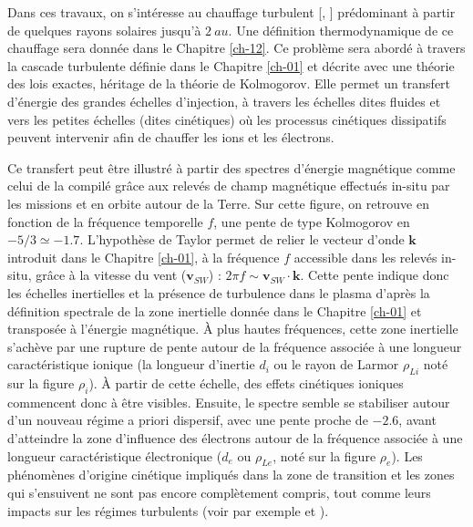 Dans ces travaux, on s'intéresse au chauffage turbulent [\cite{tu_mhd_1995}, \cite{kiyani_dissipation_2015}] prédominant à partir de quelques rayons solaires jusqu'à $\SI{2}{au}$. Une définition thermodynamique de ce chauffage sera donnée dans le Chapitre \ref{ch-12}. Ce problème sera abordé à travers la cascade turbulente définie dans le Chapitre \ref{ch-01} et décrite avec une théorie des lois exactes, héritage de la théorie de Kolmogorov. Elle permet un transfert d'énergie des grandes échelles d'injection, à travers les échelles dites fluides et vers les petites échelles (dites cinétiques) où les processus cinétiques dissipatifs peuvent intervenir afin de chauffer les ions et les électrons. 

Ce transfert peut être illustré à partir des spectres d'énergie magnétique comme celui de la  compilé grâce aux relevés de champ magnétique effectués in-situ par les missions  et  en orbite autour de la Terre.  Sur cette figure, on retrouve en fonction de la fréquence temporelle $f$, une pente de type Kolmogorov en $-5/3 \simeq -1.7$. L'hypothèse de Taylor permet de relier le vecteur d'onde $\boldsymbol{k}$ introduit dans le Chapitre \ref{ch-01}, à la fréquence $f$ accessible dans les relevés in-situ, grâce à la vitesse du vent ($\boldsymbol{v}_{SW}$) : $2 \pi f \sim \boldsymbol{v}_{SW} \cdot \boldsymbol{k}$.
Cette pente indique donc les échelles inertielles et la présence de turbulence dans le plasma d'après la définition spectrale de la zone inertielle donnée dans le Chapitre \ref{ch-01} et transposée à l'énergie magnétique. 
À plus hautes fréquences, cette zone inertielle s'achève par une rupture de pente autour de la fréquence associée à une longueur caractéristique ionique (la longueur d'inertie $d_i$ ou le rayon de Larmor $\rho_{Li}$ noté sur la figure $\rho_i$). 
À partir de cette échelle, des effets cinétiques ioniques commencent donc à être visibles. Ensuite, le spectre semble se stabiliser autour d'un nouveau régime a priori dispersif, avec une pente proche de $-2.6$, avant d'atteindre la zone d'influence des électrons autour de la fréquence associée à une longueur caractéristique électronique ($d_e$ ou $\rho_{Le}$, noté sur la figure $\rho_e$). Les phénomènes d'origine cinétique impliqués dans la zone de transition et les zones qui s'ensuivent ne sont pas encore complètement compris, tout comme leurs impacts sur les régimes turbulents (voir par exemple \cite{alexandrova_solar_2013} et \cite{sahraoui_magnetohydrodynamic_2020}). 
